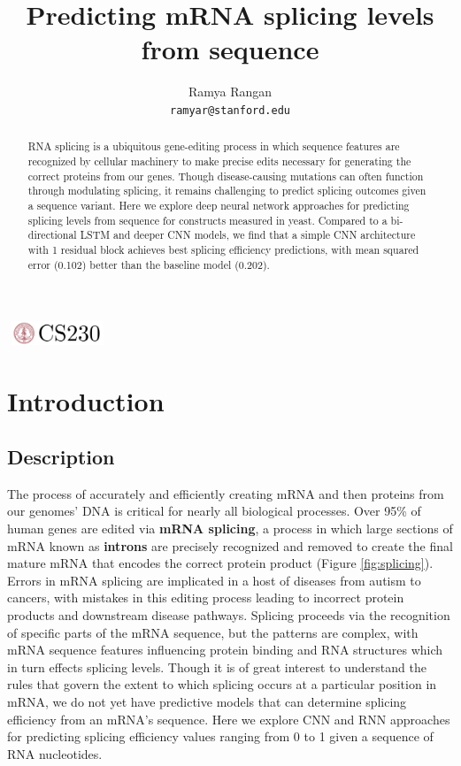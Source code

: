 \documentclass{article}
\title{Predicting mRNA splicing levels from sequence}
\author{
  Ramya Rangan\\
  \texttt{ramyar@stanford.edu} \\
}
\begin{document}

\begin{center}
\includegraphics[width=3cm, height=0.7cm]{../figures/CS230}
\end{center}

\maketitle

\begin{abstract}
RNA splicing is a ubiquitous gene-editing process in which sequence features are recognized by cellular machinery to make precise edits necessary for generating the correct proteins from our genes. Though disease-causing mutations can often function through modulating splicing, it remains challenging to predict splicing outcomes given a sequence variant. Here we explore deep neural network approaches for predicting splicing levels from sequence for constructs measured in yeast. Compared to a bi-directional LSTM and deeper CNN models, we find that a simple CNN architecture with 1 residual block achieves best splicing efficiency predictions, with mean squared error (0.102) better than the baseline model (0.202).
\end{abstract}

\section{Introduction}	
\subsection{Description}
The process of accurately and efficiently creating mRNA and then proteins from our genomes' DNA is critical for nearly all biological processes. Over 95\% of human genes are edited via {\bf mRNA splicing}, a process in which large sections of mRNA known as {\bf introns} are precisely recognized and removed to create the final mature mRNA that encodes the correct protein product (Figure \ref{fig:splicing}). Errors in mRNA splicing are implicated in a host of diseases from autism to cancers, with mistakes in this editing process leading to incorrect protein products and downstream disease pathways. Splicing proceeds via the recognition of specific parts of the mRNA sequence, but the patterns are complex, with mRNA sequence features influencing protein binding and RNA structures which in turn effects splicing levels. Though it is of great interest to understand the rules that govern the extent to which splicing occurs at a particular position in mRNA, we do not yet have predictive models that can determine splicing efficiency from an mRNA's sequence. Here we explore CNN and RNN approaches for predicting splicing efficiency values ranging from 0 to 1 given a sequence of RNA nucleotides.
\end{document}
